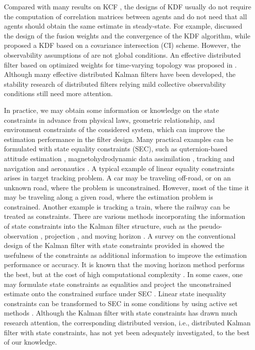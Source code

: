 \documentclass[journal,transmag]{IEEEtran}
\begin{document}
	Compared with many results on KCF \cite{olfati2009kalman, yang2014stochastic, yang2017stochastic,wang2017convergence}, the designs of KDF usually do not require the computation of correlation matrices between agents and  do not need that all agents should obtain the same estimate in steady-state.
	For example, \cite{cattivelli2010diffusion} discussed the design of the fusion weights and the convergence of the KDF algorithm, while \cite{Hu2012Diffusion} proposed a KDF based on a covariance intersection (CI) scheme.
	However, the observability assumptions of \cite{cattivelli2010diffusion,Hu2012Diffusion,Wenling2015Diffusion} are not global conditions.  
	{An effective distributed filter based on optimized weights for time-varying topology was proposed in \cite{wang2017convergence}.}	
	Although many effective distributed Kalman filters have been developed,  the stability research of distributed filters relying mild collective observability conditions still need more attention.
	
	In practice, we may obtain some information or knowledge on the state constraints in advance from physical laws, geometric relationship, and environment constraints of the considered system, which can improve the estimation performance in the filter design. {Many practical examples can be formulated with state equality constraints (SEC), such as quternion-based attitude estimation \cite{crassidis2003unscented}, magnetohydrodynamic data assimilation \cite{Chandrasekar2004State}, tracking and navigation \cite{wen1992model,shen2006reliable} and aeronautics \cite{simon2002kalman,rotea2008state}.
		A typical example of linear equality constraints arises in target tracking problem.
		A car may be traveling off-road, or on an unknown road, where the problem is unconstrained. However, most of the time it may be traveling along a given road, where the estimation problem is constrained. Another example is tracking a train, where the railway can be treated as constraints.} There are various methods incorporating the information of state constraints into the Kalman filter structure, such as the pseudo-observation \cite{julier2007kalman}, projection \cite{simon2002kalman,Te2009state, ko2007state}, and moving horizon \cite{rao2001constrained}. A survey on the conventional design of the Kalman filter with state constraints  provided in \cite{simon2010kalman} showed the usefulness of the constraints as  additional information to improve the estimation performance or accuracy.  It is known that the moving horizon method performs the best, but at the cost of high computational complexity  \cite{rao2001constrained,simon2010kalman}. {In some cases, one may formulate state constraints as equalities and project the unconstrained estimate onto the constrained surface under SEC \cite{simon2010kalman,Te2009state}.
		Linear state inequality constraints can be transformed to SEC in some conditions by using active set methods \cite{simon2010kalman}.	
		}
	Although the Kalman filter with state constraints has drawn much research attention, the corresponding distributed version,  i.e., distributed Kalman filter with state constraints, has not yet been adequately investigated, to the best of our knowledge.
	
\end{document}

